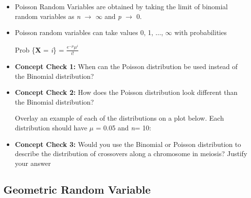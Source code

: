 \documentclass[12pt]{report}
\begin{document}
\begin{itemize}

\item Poisson Random Variables are obtained by taking the limit of binomial random variables as \textit{n} $\rightarrow$ $\infty$ and \textit{p} $\rightarrow$ 0. 

\item Poisson random variables can take values 0, 1, $\ldots$, $\infty$ with probabilities 

Prob \{\textbf{X} = \textit{i}\} = $\frac{e^{-\mu}\mu^{i}}{i!}$

\item \textbf{Concept Check 1:} When can the Poisson distribution be used instead of the Binomial distribution? 

\bigskip

\bigskip

\bigskip
\item \textbf{Concept Check 2:} How does the Poisson distribution look different than the Binomial distribution? 

\bigskip

\bigskip

\bigskip

Overlay an example of each of the distributions on a plot below. Each distribution should have $\mu$ = 0.05 and \textit{n}= 10:

\bigskip

\bigskip

\bigskip

\bigskip

\bigskip

\bigskip

\bigskip

\bigskip

\bigskip

\bigskip

\bigskip


\item \textbf{Concept Check 3:} Would you use the Binomial or Poisson distribution to describe the distribution of crossovers along a chromosome in meiosis? Justify your answer

\end{itemize}

\bigskip

\bigskip

\bigskip

\subsection{Geometric Random Variable}
\end{document}
